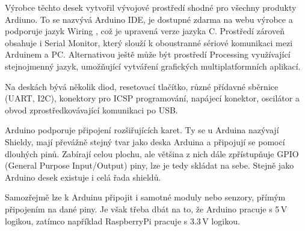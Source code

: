 	Výrobce těchto desek vytvořil vývojové prostředí shodné pro všechny produkty Ardiuno. To se nazvývá Arduino IDE, je dostupné zdarma na webu výrobce a podporuje jazyk Wiring \cite{embed_about_wiring_2011}, což je upravená verze jazyka C. Prostředí zároveň obsahuje i Serial Monitor, který slouží k oboustranné sériové komunikaci mezi Arduinem a PC. Alternativou ještě může být prostředí Processing \cite{embed_about_processing_2015} využívající stejnojmenný jazyk, umožňující vytváření grafických multiplatformních aplikací.
	
	Na deskách bývá několik diod, resetovací tlačítko, různé přídavné sběrnice (UART, I2C), konektory pro ICSP programování, napájecí konektor, oscilátor a obvod zprostředkovávající komunikaci po USB.
	
Arduino podporuje připojení rozšiřujících karet. Ty se u Arduina nazývají Shieldy, mají převážně stejný tvar jako deska Arduina a připojují se pomocí dlouhých pinů. Zabírají celou plochu, ale většina z nich dále zpřístupňuje GPIO (General Purpose Input/Output) piny, lze je tedy skládat na sebe. Stejně jako Arduino desek existuje i celá řada shieldů.
	
Samozřejmě lze k Arduinu připojit i samotné moduly nebo senzory, přímým připojením na dané piny. Je však třeba dbát na to, že Arduino pracuje s 5\,V logikou, zatímco například RaspberryPi pracuje s 3.3\,V logikou.
	
